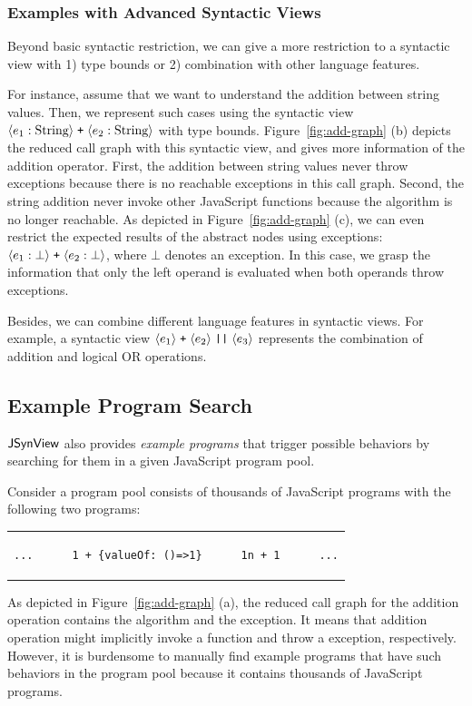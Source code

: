 \subsubsection{Examples with Advanced Syntactic Views}

Beyond basic syntactic restriction, we can give a more restriction to a
syntactic view with 1) type bounds or 2) combination with other language
features.

For instance, assume that we want to understand the addition between string
values.  Then, we represent such cases using the syntactic view
$\svhole{\expr_1: \text{String}} \; \code{+} \; \svhole{\expr_2: \text{String}}$
with type bounds.  Figure~\ref{fig:add-graph} (b) depicts the reduced call graph
with this syntactic view, and gives more information of the addition operator.
First, the addition between string values never throw exceptions because there
is no reachable exceptions in this call graph.  Second, the string addition
never invoke other JavaScript functions because the  algorithm is no
longer reachable.  As depicted in Figure~\ref{fig:add-graph} (c), we can even
restrict the expected results of the abstract nodes using exceptions:
$\svhole{\expr_1: \bot} \; \code{+} \; \svhole{\expr_2: \bot}$, where $\bot$
denotes an exception.  In this case, we grasp the information that only the left
operand is evaluated when both operands throw exceptions.

Besides, we can combine different language features in syntactic views.  For
example, a syntactic view $\svhole{\expr_1} \; \code{+} \; \svhole{\expr_2} \;
\code{||} \; \svhole{\expr_3}$ represents the combination of addition and
logical OR operations.


\subsection{Example Program Search}\label{sec:reduce-spec}

$\tool$ also provides \textit{example programs} that trigger possible behaviors
by searching for them in a given JavaScript program pool.

Consider a program pool consists of thousands of JavaScript programs with the
following two programs:
\begin{center}
  \begin{tabular}{c}
    \begin{lstlisting}[style=JS]
...      1 + {valueOf: ()=>1}      1n + 1      ...
    \end{lstlisting}
  \end{tabular}
\end{center}
As depicted in Figure~\ref{fig:add-graph} (a), the reduced call graph for the
addition operation contains the  algorithm and the 
exception.  It means that addition operation might implicitly invoke a function
and throw a  exception, respectively.  However, it is
burdensome to manually find example programs that have such behaviors in the
program pool because it contains thousands of JavaScript programs.

